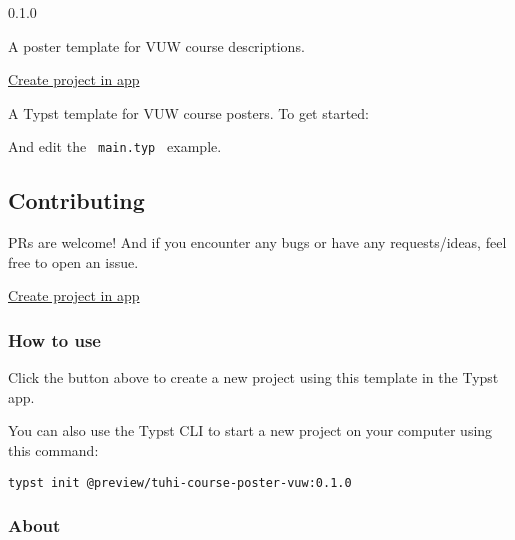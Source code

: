 { 0.1.0 }

A poster template for VUW course descriptions.

\href{/app?template=tuhi-course-poster-vuw&version=0.1.0}{Create project
in app}

\label{readme}
A Typst template for VUW course posters. To get started:

\begin{Shaded}
\begin{Highlighting}[]
\end{Highlighting}
\end{Shaded}

And edit the \texttt{\ main.typ\ } example.


\subsection{Contributing}\label{contributing}

PRs are welcome! And if you encounter any bugs or have any
requests/ideas, feel free to open an issue.

\href{/app?template=tuhi-course-poster-vuw&version=0.1.0}{Create project
in app}

\subsubsection{How to use}\label{how-to-use}

Click the button above to create a new project using this template in
the Typst app.

You can also use the Typst CLI to start a new project on your computer
using this command:

\begin{verbatim}
typst init @preview/tuhi-course-poster-vuw:0.1.0
\end{verbatim}



\subsubsection{About}\label{about}

